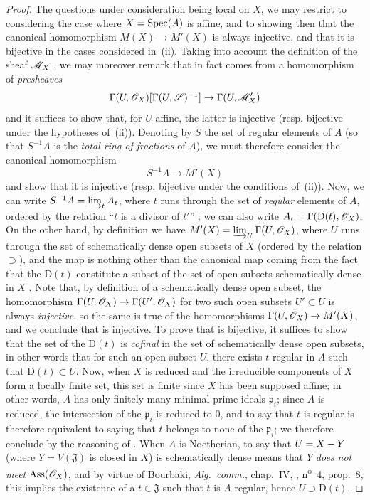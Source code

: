 \begin{proof}
The questions under consideration being local on $X$, we may restrict to considering the case where $X=\operatorname{Spec}(A)$ is affine, and to showing then that the canonical homomorphism $M(X)\to M'(X)$ is always injective, and that it is bijective in the cases considered in~(ii).
Taking into account the definition of the sheaf $\mathscr{M}_X$ , we may moreover remark that  in fact comes from a homomorphism of \emph{presheaves}
\[
  \Gamma(U,\mathscr{O}_X)[\Gamma(U,\mathscr{S})^{-1}]\to\Gamma(U,\mathscr{M}'_X)
\]
and it suffices to show that, for $U$ affine, the latter is injective (resp. bijective under the hypotheses of~(ii)).
Denoting by $S$ the set of regular elements of $A$ (so that $S^{-1}A$ is the \emph{total ring of fractions} of $A$), we must therefore consider the canonical homomorphism
\[
\label{IV.20.2.11.1}
  S^{-1}A\to M'(X)
  \tag{20.2.11.1}
\]
and show that it is injective (resp. bijective under the conditions of~(ii)).
Now, we can write $S^{-1}A=\varinjlim_t A_t$, where $t$ runs through the set of \emph{regular} elements of $A$, ordered by the relation ``$t$ is a divisor of $t'$'' ; we can also write $A_t=\Gamma(\mathrm{D}(t),\mathscr{O}_X)$.
On the other hand, by definition we have $M'(X)=\varinjlim_U\Gamma(U,\mathscr{O}_X)$, where $U$ runs through the set of schematically dense open subsets of $X$ (ordered by the relation $\supset$), and the map  is nothing other than the canonical map coming from the fact that the $\mathrm{D}(t)$ constitute a subset of the set of open subsets schematically dense in $X$ .
Note that, by definition of a schematically dense open subset, the homomorphism $\Gamma(U,\mathscr{O}_X)\to\Gamma(U',\mathscr{O}_X)$ for two such open subsets $U'\subset U$ is always \emph{injective}, so the same is true of the homomorphisms $\Gamma(U,\mathscr{O}_X)\to M'(X)$, and we conclude that  is injective.
To prove that  is bijective, it suffices to show that the set of the $\mathrm{D}(t)$ is \emph{cofinal} in the set of schematically dense open subsets, in other words that for such an open subset $U$, there exists $t$ regular in $A$ such that $\mathrm{D}(t)\subset U$.
Now, when $X$ is reduced and the irreducible components of $X$ form a locally finite set, this set is finite since $X$ has been supposed affine; in other words, $A$ has only finitely many minimal prime ideals $\mathfrak{p}_i$; since $A$ is reduced, the intersection of the $\mathfrak{p}_i$ is reduced to $0$, and to say that $t$ is regular is therefore equivalent to saying that $t$ belongs to none of the $\mathfrak{p}_i$; we therefore conclude by the reasoning of .
When $A$ is Noetherian, to say that $U=X- Y$ (where $Y=V(\mathfrak{J})$ is closed in $X$) is schematically dense means  that $Y$ \emph{does not meet} $\operatorname{Ass}(\mathscr{O}_X)$, and by virtue of Bourbaki, \emph{Alg.~comm.}, chap.~IV, , n\textsuperscript{o}~4, prop.~8, this implies the existence of a $t\in\mathfrak{J}$ such that $t$ is $A$-regular, hence $U\supset\mathrm{D}(t)$.


\end{proof}
